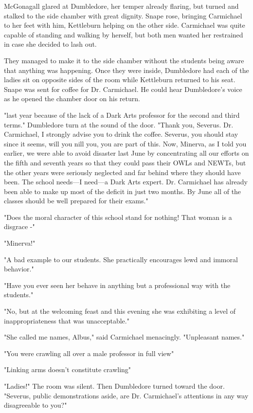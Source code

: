 McGonagall glared at Dumbledore, her temper already flaring, but turned and stalked to the side chamber with great dignity. Snape rose, bringing Carmichael to her feet with him, Kettleburn helping on the other side. Carmichael was quite capable of standing and walking by herself, but both men wanted her restrained in case she decided to lash out.

They managed to make it to the side chamber without the students being aware that anything was happening. Once they were inside, Dumbledore had each of the ladies sit on opposite sides of the room while Kettleburn returned to his seat. Snape was sent for coffee for Dr. Carmichael. He could hear Dumbledore's voice as he opened the chamber door on his return.

"{\el}last year because of the lack of a Dark Arts professor for the second and third terms." Dumbledore turn at the sound of the door. "Thank you, Severus. Dr. Carmichael, I strongly advise you to drink the coffee. Severus, you should stay since it seems, will you nill you, you are part of this. Now, Minerva, as I told you earlier, we were able to avoid disaster last June by concentrating all our efforts on the fifth and seventh years so that they could pass their OWLs and NEWTs, but the other years were seriously neglected and far behind where they should have been. The school needs—I need—a Dark Arts expert. Dr. Carmichael has already been able to make up most of the deficit in just two months. By June all of the classes should be well prepared for their exams."

"Does the moral character of this school stand for nothing! That woman is a disgrace -"

"Minerva!"

"A bad example to our students. She practically encourages lewd and immoral behavior."

"Have you ever seen her behave in anything but a professional way with the students."

"No, but at the welcoming feast and this evening she was exhibiting a level of inappropriateness that was unacceptable."

"She called me names, Albus," said Carmichael menacingly. "Unpleasant names."

"You were crawling all over a male professor in full view{\el}"

"Linking arms doesn't constitute crawling{\el}"

"Ladies!" The room was silent. Then Dumbledore turned toward the door. "Severus, public demonstrations aside, are Dr. Carmichael's attentions in any way disagreeable to you?"

